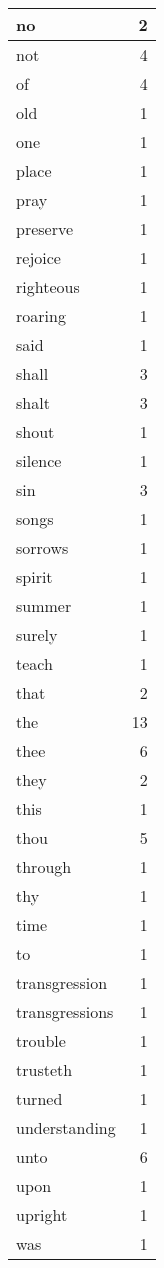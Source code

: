 \begin{center}
\begin{longtable}{l|r}
no & 2 \\ \hline
not & 4 \\ \hline
of & 4 \\ \hline
old & 1 \\ \hline
one & 1 \\ \hline
place & 1 \\ \hline
pray & 1 \\ \hline
preserve & 1 \\ \hline
rejoice & 1 \\ \hline
righteous & 1 \\ \hline
roaring & 1 \\ \hline
said & 1 \\ \hline
shall & 3 \\ \hline
shalt & 3 \\ \hline
shout & 1 \\ \hline
silence & 1 \\ \hline
sin & 3 \\ \hline
songs & 1 \\ \hline
sorrows & 1 \\ \hline
spirit & 1 \\ \hline
summer & 1 \\ \hline
surely & 1 \\ \hline
teach & 1 \\ \hline
that & 2 \\ \hline
the & 13 \\ \hline
thee & 6 \\ \hline
they & 2 \\ \hline
this & 1 \\ \hline
thou & 5 \\ \hline
through & 1 \\ \hline
thy & 1 \\ \hline
time & 1 \\ \hline
to & 1 \\ \hline
transgression & 1 \\ \hline
transgressions & 1 \\ \hline
trouble & 1 \\ \hline
trusteth & 1 \\ \hline
turned & 1 \\ \hline
understanding & 1 \\ \hline
unto & 6 \\ \hline
upon & 1 \\ \hline
upright & 1 \\ \hline
was & 1 \\ \hline

\end{longtable}
\end{center}
